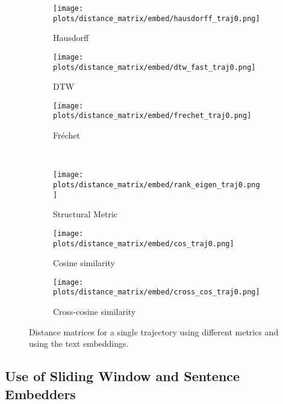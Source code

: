 \documentclass[a4paper,12pt]{article}
\begin{document}
\begin{figure}[H]
    \centering
    \begin{subfigure}[b]{0.32\textwidth}
        \centering
        \texttt{[image: plots/distance\_matrix/embed/hausdorff\_traj0.png]}
        \caption{Hausdorff}
    \end{subfigure}
    \begin{subfigure}[b]{0.32\textwidth}
        \centering
        \texttt{[image: plots/distance\_matrix/embed/dtw\_fast\_traj0.png]}
        \caption{DTW}
    \end{subfigure}
    \begin{subfigure}[b]{0.32\textwidth}
        \centering
        \texttt{[image: plots/distance\_matrix/embed/frechet\_traj0.png]}
        \caption{Fréchet}
    \end{subfigure}
    \\[0.5em]
    \begin{subfigure}[b]{0.32\textwidth}
        \centering
        \texttt{[image: plots/distance\_matrix/embed/rank\_eigen\_traj0.png]}
        \caption{Structural Metric}
    \end{subfigure}
    \begin{subfigure}[b]{0.32\textwidth}
        \centering
        \texttt{[image: plots/distance\_matrix/embed/cos\_traj0.png]}
        \caption{Cosine similarity}
    \end{subfigure}
    \begin{subfigure}[b]{0.32\textwidth}
        \centering
        \texttt{[image: plots/distance\_matrix/embed/cross\_cos\_traj0.png]}
        \caption{Cross-cosine similarity}
    \end{subfigure}
    \caption{Distance matrices for a single trajectory using different metrics and using the text embeddings.}
    \label{fig:distance_metrics_comparison_embed}
\end{figure}



\subsection{Use of Sliding Window and Sentence Embedders  }
\label{subsec:sliding_window}
\end{document}
